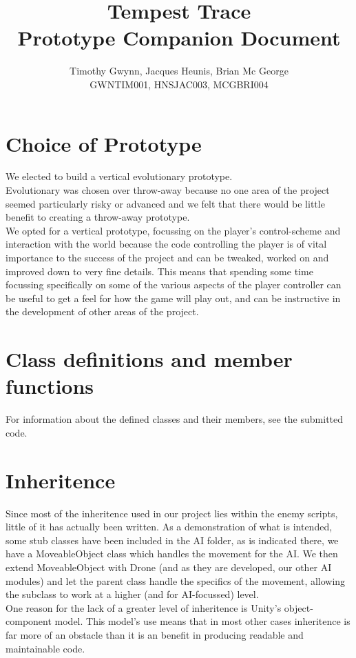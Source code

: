 \documentclass[a4paper,10pt]{article}
\title{Tempest Trace \\
Prototype Companion Document }
\author{Timothy Gwynn, Jacques Heunis, Brian Mc George\\
GWNTIM001, HNSJAC003, MCGBRI004}
\begin{document}
\maketitle

\section{Choice of Prototype}
We elected to build a vertical evolutionary prototype. \\
Evolutionary was chosen over throw-away because no one area of the project seemed particularly risky or advanced and we felt that there would be little benefit to creating a throw-away prototype. \\
We opted for a vertical prototype, focussing on the player's control-scheme and interaction with the world because the code controlling the player is of vital importance to the success of the project
and can be tweaked, worked on and improved down to very fine details. This means that spending some time focussing specifically on some of the various aspects of the player controller can be useful to get a feel for how the game will play out, and can be instructive in the development of other areas of the project.
\section{Class definitions and member functions}
For information about the defined classes and their members, see the submitted code.
\section{Inheritence}
Since most of the inheritence used in our project lies within the enemy scripts, little of it has actually been written. As a demonstration of what is intended, some stub classes have been included in the AI folder, as is indicated there, we have a MoveableObject class which handles the movement for the AI. We then extend MoveableObject with Drone (and as they are developed, our other AI modules) and let the parent class handle the specifics of the movement, allowing the subclass to work at a higher (and for AI-focussed) level. \\
One reason for the lack of a greater level of inheritence is Unity's object-component model. This model's use means that in most other cases inheritence is far more of an obstacle than it is an benefit in producing readable and maintainable code.
\end{document}
